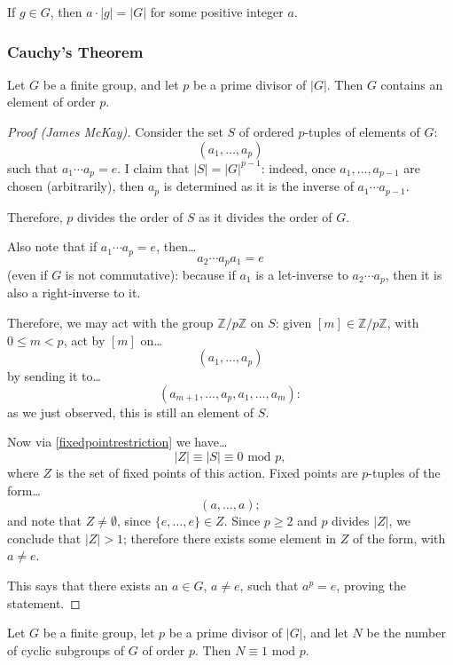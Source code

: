 \begin{corollary}
\label{elementorderdividesgrouporder}
If $g \in G$, then $a \cdot |g| = |G|$ for some positive integer $a$.
\end{corollary}

\subsubsection{Cauchy's Theorem}

\begin{theorem}
\label{cauchysthm}
Let $G$ be a finite group, and let $p$ be a prime divisor of $|G|$. Then $G$ contains an element of order $p$.
\end{theorem}

\begin{proof}[Proof (James McKay)]
Consider the set $S$ of ordered $p$-tuples of elements of $G$:
$$(a_1, \dots, a_p)$$
such that $a_1\cdots a_p = e$. I claim that $|S| = |G|^{p-1}$: indeed, once $a_1, \dots, a_{p-1}$ are chosen (arbitrarily), then
$a_p$ is determined as it is the inverse of $a_1 \cdots a_{p-1}.$

Therefore, $p$ divides the order of $S$ as it divides the order of $G$.

Also note that if $a_1\cdots a_p = e$, then\dots
$$a_2\cdots a_pa_1 = e$$
(even if $G$ is not commutative): because if $a_1$ is a let-inverse to $a_2\cdots a_p$, then it is also a right-inverse to it.

Therefore, we may act with the group $\mathbb{Z} / p \mathbb{Z}$ on $S$: given $[m] \in \mathbb{Z} / p \mathbb{Z}$, with
$0 \leq m < p$, act by $[m]$ on\dots
$$(a_1,\dots,a_p)$$
by sending it to\dots
$$(a_{m+1}, \dots, a_p, a_1, \dots, a_m):$$
as we just observed, this is still an element of $S$.

Now via \ref{fixedpointrestriction} we have\dots
$$|Z| \equiv |S| \equiv 0 \textrm{ mod } p,$$
where $Z$ is the set of fixed points of this action. Fixed points are $p$-tuples of the form\dots
$$(a, \dots, a);$$
and note that $Z \neq \emptyset$, since $\{ e, \dots, e\} \in Z$. Since $p \geq 2$ and $p$ divides $|Z|$, we conclude that $|Z| > 1$;
therefore there exists some element in $Z$ of the form, with $a \neq e$.

This says that there exists an $a \in G$, $a \neq e$, such that $a^p = e$, proving the statement.
\end{proof}

\begin{corollary}
Let $G$ be a finite group, let $p$ be a prime divisor of $|G|$, and let $N$ be the number of cyclic subgroups of $G$ of order $p$. Then $N \equiv 1 \textrm{ mod } p$.
\end{corollary}